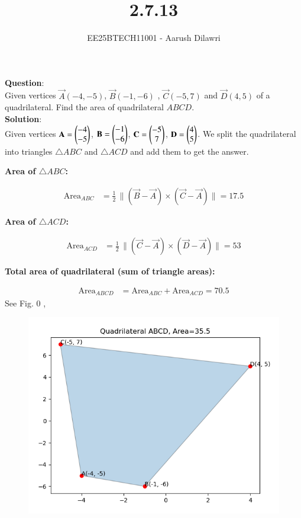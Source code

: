 \documentclass[journal]{IEEEtran}
\begin{document}

\vspace{3cm}

\title{2.7.13}
\author{EE25BTECH11001 - Aarush Dilawri}
{\let\newpage\relax\maketitle}

\renewcommand{\thefigure}{\theenumi}
\renewcommand{\thetable}{\theenumi}
\setlength{\intextsep}{10pt} %
\textbf{Question}:\\
Given vertices $\vec{A}(-4,-5)$, $\vec{B}(-1,-6)$ , $\vec{C}(-5,7)$ and $\vec{D}(4,5)$ of a quadrilateral. Find the area of quadrilateral $ABCD$.\\
\textbf{Solution}:\\


Given vertices $\mathbf{A}=\begin{pmatrix}-4\\-5\end{pmatrix}$, $\mathbf{B}=\begin{pmatrix}-1\\-6\end{pmatrix}$, $\mathbf{C}=\begin{pmatrix}-5\\7\end{pmatrix}$, $\mathbf{D}=\begin{pmatrix}4\\5\end{pmatrix}$.  
We split the quadrilateral into triangles $\triangle ABC$ and $\triangle ACD$ and add them to get the answer.




\textbf{Area of $\triangle ABC$:}

\begin{align}
\text{Area}_{ABC}
&= \tfrac{1}{2}\,\big\lVert (\vec{B}-\vec{A}) \times (\vec{C}-\vec{A}) \big\rVert = 17.5
\end{align}

\textbf{Area of $\triangle ACD$:}

\begin{align}
\text{Area}_{ACD}
&= \tfrac{1}{2}\,\big\lVert (\vec{C}-\vec{A}) \times (\vec{D}-\vec{A}) \big\rVert = 53
\end{align}

\textbf{Total area of quadrilateral (sum of triangle areas):}

\begin{align}
\text{Area}_{ABCD} &= \text{Area}_{ABC} + \text{Area}_{ACD} = 70.5
\end{align}
See Fig. 0 ,
\begin{figure}[H]
\begin{center}
\includegraphics[width=0.6\columnwidth]{figs/fig.png}
\end{center}
\caption{}
\label{fig:Fig1}
\end{figure}
\end{document}
